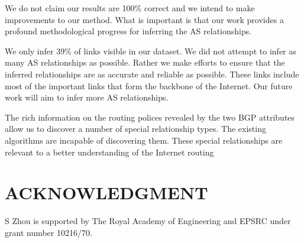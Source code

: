 \documentclass[conference]{IEEEtran}
\begin{document}
We do not claim our results are 100\% correct and we intend to make improvements to our method. What is important is that our work provides a profound methodological progress for inferring the AS relationships. 

We only infer 39\% of links visible in our dataset. We did not attempt to infer as many AS relationships as possible.  Rather we make efforts to ensure that the inferred relationships are as accurate and reliable as possible. These links include most of the important links that form the backbone of the Internet. Our future work will aim to infer more AS relationships.

The rich information on the routing polices revealed by the two BGP attributes  allow us to discover a number of special relationship types. The existing  algorithms are incapable of discovering them. These special relationships are relevant to a better understanding of the Internet routing




\section*{ACKNOWLEDGMENT}
S Zhou is supported by The Royal Academy of Engineering and EPSRC under grant number 10216/70.





\end{document}
